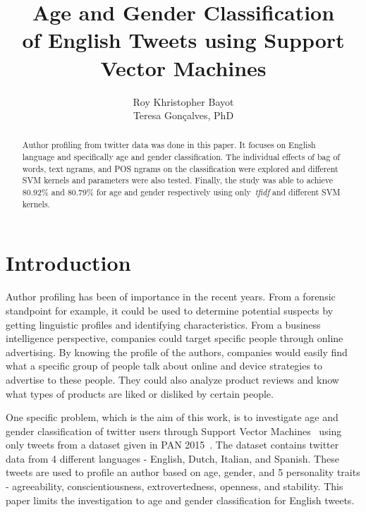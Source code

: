 \documentclass[a4paper]{llncs}
\begin{document}
\title{Age and Gender Classification\\
of English Tweets using Support Vector Machines}
\titlerunning{}
\author{Roy Khristopher Bayot\\Teresa Gonçalves, PhD}

\maketitle
\begin{abstract}
Author profiling from twitter data was done in this paper. It focuses on English language and specifically age and gender classification. The individual effects of bag of words, text ngrams, and POS ngrams on the classification were explored and different SVM kernels and parameters were also tested. Finally, the study was able to achieve 80.92\% and 80.79\% for age and gender respectively using only~\textit{tfidf} and different SVM kernels. 
\end{abstract}

\section{Introduction}
Author profiling has been of importance in the recent years. From a forensic standpoint for example, it could be used to determine potential suspects by getting linguistic profiles and identifying characteristics. From a business intelligence perspective, companies could target specific people through online advertising. By knowing the profile of the authors, companies would easily find what a specific group of people talk about online and device strategies to advertise to these people. They could also analyze product reviews and know what types of products are liked or disliked by certain people. 

One specific problem, which is the aim of this work, is to investigate age and gender classification of twitter users through Support Vector Machines~\cite{cortes1995support} using only tweets from a dataset given in PAN 2015~\cite{rangel:2015}. The dataset contains twitter data from 4 different languages - English, Dutch, Italian, and Spanish. These tweets are used to profile an author based on age, gender, and 5 personality traits - agreeability, conscientiousness, extrovertedness, openness, and stability. This paper limits the investigation to age and gender classification for English tweets.   
\end{document}
